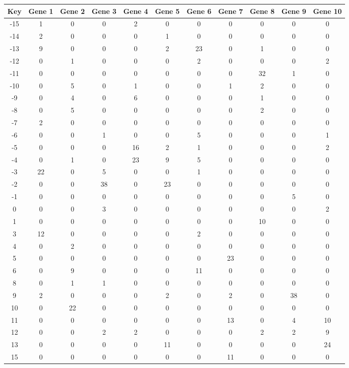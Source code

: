 \begin{tabular}{|c|c|c|c|c|c|c|c|c|c|c|}
\hline
Key & Gene 1 & Gene 2 & Gene 3 & Gene 4 & Gene 5 & Gene 6 & Gene 7 & Gene 8 & Gene 9 & Gene 10 \\
\hline
-15 & 1 & 0 & 0 & 2 & 0 & 0 & 0 & 0 & 0 & 0 \\
-14 & 2 & 0 & 0 & 0 & 1 & 0 & 0 & 0 & 0 & 0 \\
-13 & 9 & 0 & 0 & 0 & 2 & 23 & 0 & 1 & 0 & 0 \\
-12 & 0 & 1 & 0 & 0 & 0 & 2 & 0 & 0 & 0 & 2 \\
-11 & 0 & 0 & 0 & 0 & 0 & 0 & 0 & 32 & 1 & 0 \\
-10 & 0 & 5 & 0 & 1 & 0 & 0 & 1 & 2 & 0 & 0 \\
-9 & 0 & 4 & 0 & 6 & 0 & 0 & 0 & 1 & 0 & 0 \\
-8 & 0 & 5 & 0 & 0 & 0 & 0 & 0 & 2 & 0 & 0 \\
-7 & 2 & 0 & 0 & 0 & 0 & 0 & 0 & 0 & 0 & 0 \\
-6 & 0 & 0 & 1 & 0 & 0 & 5 & 0 & 0 & 0 & 1 \\
-5 & 0 & 0 & 0 & 16 & 2 & 1 & 0 & 0 & 0 & 2 \\
-4 & 0 & 1 & 0 & 23 & 9 & 5 & 0 & 0 & 0 & 0 \\
-3 & 22 & 0 & 5 & 0 & 0 & 1 & 0 & 0 & 0 & 0 \\
-2 & 0 & 0 & 38 & 0 & 23 & 0 & 0 & 0 & 0 & 0 \\
-1 & 0 & 0 & 0 & 0 & 0 & 0 & 0 & 0 & 5 & 0 \\
0 & 0 & 0 & 3 & 0 & 0 & 0 & 0 & 0 & 0 & 2 \\
1 & 0 & 0 & 0 & 0 & 0 & 0 & 0 & 10 & 0 & 0 \\
3 & 12 & 0 & 0 & 0 & 0 & 2 & 0 & 0 & 0 & 0 \\
4 & 0 & 2 & 0 & 0 & 0 & 0 & 0 & 0 & 0 & 0 \\
5 & 0 & 0 & 0 & 0 & 0 & 0 & 23 & 0 & 0 & 0 \\
6 & 0 & 9 & 0 & 0 & 0 & 11 & 0 & 0 & 0 & 0 \\
8 & 0 & 1 & 1 & 0 & 0 & 0 & 0 & 0 & 0 & 0 \\
9 & 2 & 0 & 0 & 0 & 2 & 0 & 2 & 0 & 38 & 0 \\
10 & 0 & 22 & 0 & 0 & 0 & 0 & 0 & 0 & 0 & 0 \\
11 & 0 & 0 & 0 & 0 & 0 & 0 & 13 & 0 & 4 & 10 \\
12 & 0 & 0 & 2 & 2 & 0 & 0 & 0 & 2 & 2 & 9 \\
13 & 0 & 0 & 0 & 0 & 11 & 0 & 0 & 0 & 0 & 24 \\
15 & 0 & 0 & 0 & 0 & 0 & 0 & 11 & 0 & 0 & 0 \\
\hline
\end{tabular}